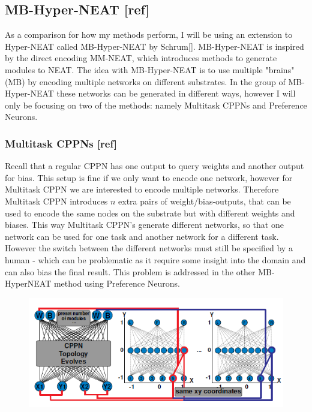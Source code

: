 \subsection{MB-Hyper-NEAT [ref]}
As a comparison for how my methods perform, I will be  using an extension to Hyper-NEAT called MB-Hyper-NEAT by Schrum[]. MB-Hyper-NEAT is inspired by the direct encoding MM-NEAT, which introduces methods to generate modules to NEAT. The idea with MB-Hyper-NEAT is to use multiple "brains" (MB) by encoding multiple networks on different substrates. In the group of MB-Hyper-NEAT these networks can be generated in different ways, however I will only be focusing on two of the methods: namely Multitask CPPNs and Preference Neurons.
\newpage
\subsubsection{Multitask CPPNs [ref]}
Recall that a regular CPPN has one output to query weights and another output for bias. This setup is fine if we only want to encode one network, however for Multitask CPPN we are interested to encode multiple networks. Therefore Multitask CPPN introduces $ n $ extra pairs of weight/bias-outputs, that can be used to encode the same nodes on the substrate but with different weights and biases. This way Multitask CPPN's generate different networks, so that one network can be used for one task and another network for a different task. However the switch between the different networks must still be specified by a human - which can be problematic as it require some insight into the domain and can also bias the final result. This problem is addressed in the other MB-HyperNEAT method using Preference Neurons.
\begin{figure}[!ht]
\centering
\includegraphics[scale=0.6]{MultitaskCPPN}
\caption{}
\end{figure}
